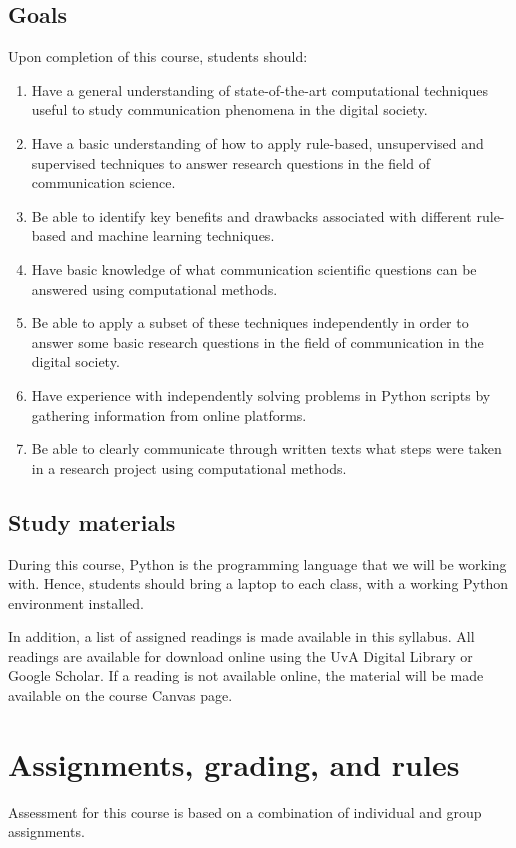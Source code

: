 \documentclass[a4paper,10pt,twocolumn]{report}
\begin{document}
	\section{Goals}
	Upon completion of this course, students should:
	\begin{enumerate}[a]
		\item Have a general understanding of state-of-the-art computational techniques useful to study communication phenomena in the digital society.
		\item Have a basic understanding of how to apply rule-based, unsupervised and supervised techniques to answer research questions in the field of communication science.
		\item Be able to identify key benefits and drawbacks associated with different rule-based and machine learning techniques.
		\item Have basic knowledge of what communication scientific questions can be answered using computational methods.
		\item Be able to apply a subset of these techniques independently in order to answer some basic research questions in the field of communication in the digital society.
		\item Have experience with independently solving problems in Python scripts by gathering information from online platforms.
		\item Be able to clearly communicate through written texts what steps were taken in a research project using computational methods.
	\end{enumerate}

	\section{Study materials}
	During this course, Python is the programming language that we will be working with. Hence, students should bring a laptop to each class, with a working Python environment installed.  
	
	In addition, a list of assigned readings is made available in this syllabus. All readings are available for download online using the UvA Digital Library or Google Scholar. If a reading is not available online, the material will be made available on the course Canvas page.
	
	
\chapter{Assignments, grading, and rules}
Assessment for this course is based on a combination of individual and group assignments. 
	
\end{document}
